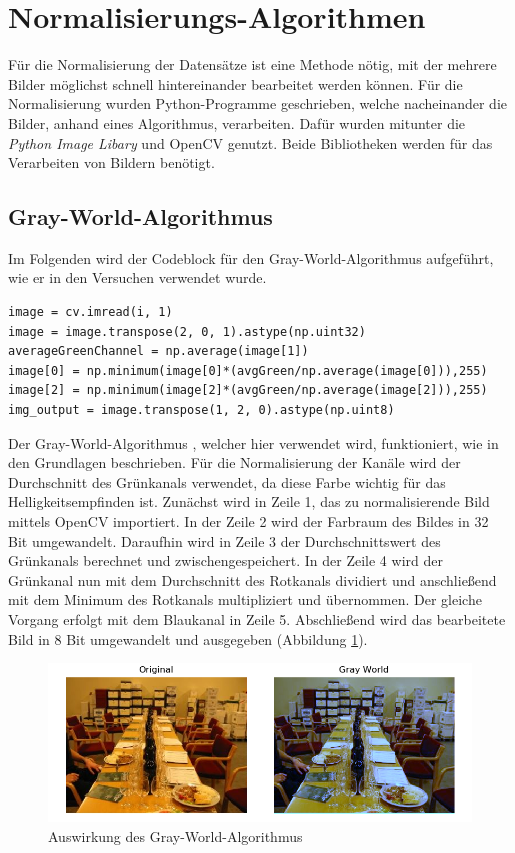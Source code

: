 \section{Normalisierungs-Algorithmen}\label{s.nalgorithmen}
Für die Normalisierung der Datensätze ist eine Methode nötig, mit der mehrere Bilder möglichst schnell hintereinander bearbeitet werden können. Für die Normalisierung wurden Python-Programme geschrieben, welche nacheinander die Bilder, anhand eines Algorithmus, verarbeiten. Dafür wurden mitunter die \textit{Python Image Libary} und OpenCV genutzt. Beide Bibliotheken werden für das Verarbeiten von Bildern benötigt. 
\newpage
\subsection{Gray-World-Algorithmus} 
Im Folgenden wird der Codeblock für den Gray-World-Algorithmus aufgeführt, wie er in den Versuchen verwendet wurde.\\
\begin{lstlisting}
image = cv.imread(i, 1)
image = image.transpose(2, 0, 1).astype(np.uint32)
averageGreenChannel = np.average(image[1])
image[0] = np.minimum(image[0]*(avgGreen/np.average(image[0])),255)
image[2] = np.minimum(image[2]*(avgGreen/np.average(image[2])),255)
img_output = image.transpose(1, 2, 0).astype(np.uint8)
\end{lstlisting}
Der Gray-World-Algorithmus \cite{gray2012world}, welcher hier verwendet wird, funktioniert, wie in den Grundlagen beschrieben. Für die Normalisierung der Kanäle wird der Durchschnitt des Grünkanals verwendet, da diese Farbe wichtig für das Helligkeitsempfinden ist. Zunächst wird in Zeile 1, das zu normalisierende Bild mittels OpenCV importiert. In der Zeile 2 wird der Farbraum des Bildes in 32 Bit umgewandelt. Daraufhin wird in Zeile 3 der Durchschnittswert des Grünkanals berechnet und zwischengespeichert. In der Zeile 4 wird der Grünkanal nun mit dem Durchschnitt des Rotkanals dividiert und anschließend mit dem Minimum des Rotkanals multipliziert und übernommen. Der gleiche Vorgang erfolgt mit dem Blaukanal in Zeile 5. Abschließend wird das bearbeitete Bild in 8 Bit umgewandelt und ausgegeben (Abbildung \ref{img:gwnimg}). 
\begin{figure}
	[h]
	\centering
	\includegraphics[scale=0.6]{Sources/gwn.png}
	\caption{Auswirkung des Gray-World-Algorithmus}
	\label{img:gwnimg}
\end{figure}
\newpage

